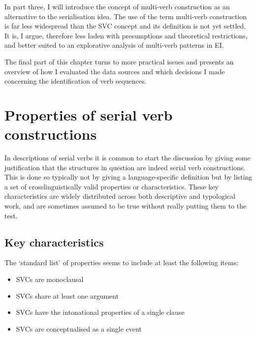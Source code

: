 In part three, I will introduce the concept of multi-verb construction as an alternative to the serialisation idea. The use of the term multi-verb construction is far less widespread than the SVC concept and its definition is not yet settled. It is, I argue, therefore less laden with presumptions and theoretical restrictions, and better suited to an explorative analysis of multi-verb patterns in EI. 

The final part of this chapter turns to more practical issues and presents an overview of how I evaluated the data sources and which decisions I made concerning the identification of verb sequences. 

\section{Properties of serial verb constructions} \label{section:properties}

In descriptions of serial verbs it is common to start the discussion by giving some justification that the structures in question are indeed serial verb constructions. This is done so typically not by giving a language-specific definition but by listing a set of crosslinguistically valid properties or characteristics. These key characteristics are widely distributed across both descriptive and typological work, and are sometimes assumed to be true without really putting them to the test. 

\subsection{Key characteristics} \label{subsection:keychars}

The `standard list' of properties seems to include at least the following items:

\begin{itemize}
\item SVCs are monoclausal
\item SVCs share at least one argument
\item SVCs have the intonational properties of a single clause
\item SVCs are conceptualised as a single event
\end{itemize}

